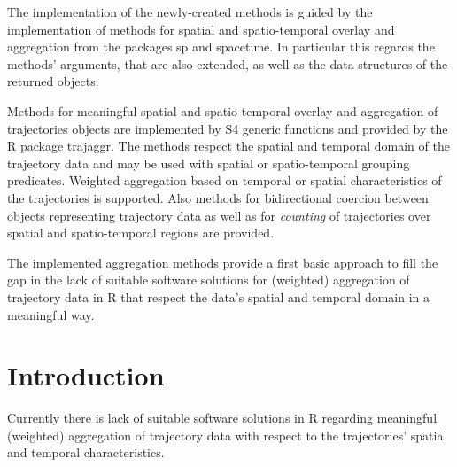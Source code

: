 \documentclass[12pt, oneside, a4paper]{scrbook}
\newcommand{\pkg}[1]{{\normalfont\fontseries{b}\selectfont #1}}
\let\proglang=\textsf
\begin{document}
The implementation of the newly-created methods is guided by the implementation of methods for spatial and spatio-temporal overlay and aggregation from the packages \pkg{sp} and \pkg{spacetime}. 
In particular this regards the methods' arguments, that are also extended, as well as the data structures of the returned objects.

Methods for meaningful spatial and spatio-temporal overlay and aggregation of \pkg{trajectories} objects are implemented by S4 generic functions and provided by the \proglang{R} package \pkg{trajaggr}.
The methods respect the spatial and temporal domain of the trajectory data and may be used with spatial or spatio-temporal grouping predicates. 
Weighted aggregation based on temporal or spatial characteristics of the trajectories is supported. 
Also methods for bidirectional coercion between objects representing trajectory data as well as for \textit{counting} of trajectories over spatial and spatio-temporal regions are provided.

The implemented aggregation methods provide a first basic approach to fill the gap in the lack of suitable software solutions for (weighted) aggregation of trajectory data in \proglang{R} that respect the data's spatial and temporal domain in a meaningful way.


\tableofcontents

\listoftables
\begingroup
\let\clearpage\relax
\listoffigures
\endgroup


\mainmatter




\chapter{Introduction}

Currently there is lack of suitable software solutions in \proglang{R} regarding meaningful (weighted) aggregation of trajectory data with respect to the trajectories' spatial and temporal characteristics.
\par\medskip
\end{document}

